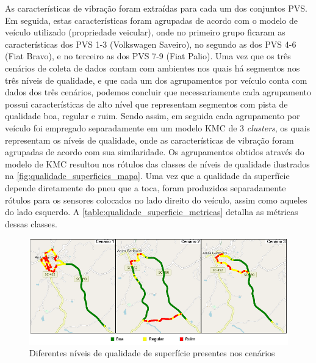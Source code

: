 As características de vibração foram extraídas para cada um dos conjuntos PVS. Em seguida, estas características foram agrupadas de acordo com o modelo de veículo utilizado (propriedade veicular), onde no primeiro grupo ficaram as características dos PVS 1-3 (Volkswagen Saveiro), no segundo as dos PVS 4-6 (Fiat Bravo), e no terceiro as dos PVS 7-9 (Fiat Palio). Uma vez que os três cenários de coleta de dados contam com ambientes nos quais há segmentos nos três níveis de qualidade, e que cada um dos agrupamentos por veículo conta com dados dos três cenários, podemos concluir que necessariamente cada agrupamento possui características de alto nível que representam segmentos com pista de qualidade boa, regular e ruim. Sendo assim, em seguida cada agrupamento por veículo foi empregado separadamente em um modelo KMC de 3 \textit{clusters}, os quais representam os níveis de qualidade, onde as características de vibração foram agrupadas de acordo com sua similaridade. Os agrupamentos obtidos através do modelo de KMC resultou nos rótulos das classes de níveis de qualidade ilustrados na \autoref{fig:qualidade_superficies_mapa}. Uma vez que a qualidade da superfície depende diretamente do pneu que a toca, foram produzidos separadamente rótulos para os sensores colocados no lado direito do veículo, assim como aqueles do lado esquerdo. A \autoref{table:qualidade_superficie_metricas} detalha as métricas dessas classes.  
 
\begin{figure}[h!]
  \centering
  \caption{Diferentes níveis de qualidade de superfície presentes nos cenários}
   \label{fig:qualidade_superficies_mapa}
   \includegraphics[width=1\textwidth]{figuras/fig_27.png}
\end{figure}

